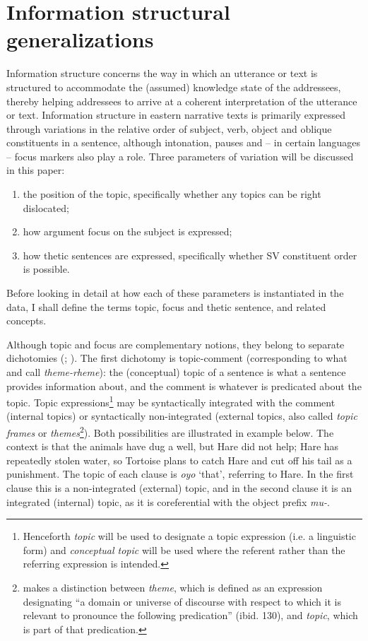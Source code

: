 \documentclass[output=paper]{langsci/langscibook}
\begin{document}
\section{Information structural generalizations}\label{§2:information.nicolle}

Information structure concerns the way in which an utterance or text is structured to accommodate the (assumed) knowledge state of the addressees, thereby helping addressees to arrive at a coherent interpretation of the utterance or text. Information structure in eastern  narrative texts is primarily expressed through variations in the relative order of subject, verb, object and oblique constituents in a sentence, although intonation, pauses and -- in certain languages -- focus markers also play a role. Three parameters of variation will be discussed in this paper:

\begin{enumerate}[noitemsep]
\item the position of the topic, specifically whether any topics can be right dislocated;
\item how argument focus on the subject is expressed;
\item how thetic sentences are expressed, specifically whether SV constituent order is possible.
\end{enumerate}

Before looking in detail at how each of these parameters is instantiated in the data, I shall define the terms topic, focus and thetic sentence, and related concepts.

Although topic and focus are complementary notions, they belong to separate dichotomies (\citealt[66]{decat2007}; \citealt[42]{erteschikshir2007}). The first dichotomy is topic-comment (corresponding to what \citet{halliday1967} and \citet{dik1981,dik1989} call \textit{theme-rheme}): the (conceptual) topic of a sentence is what a sentence provides information about, and the comment is whatever is predicated about the topic. Topic expressions\footnote{Henceforth \textit{topic} will be used to designate a topic expression (i.e. a linguistic form) and \textit{conceptual topic} will be used where the referent rather than the referring expression is intended.} may be syntactically integrated with the comment (internal topics) or syntactically non-integrated (external topics, also called \textit{topic frames} or \textit{themes}\footnote{\citet[129--144]{dik1981} makes a distinction between \textit{theme}, which is defined as an expression designating “a domain or universe of discourse with respect to which it is relevant to pronounce the following predication” (ibid. 130), and \textit{topic}, which is part of that predication.}). Both possibilities are illustrated in example  below. The context is that the animals have dug a well, but Hare did not help; Hare has repeatedly stolen water, so Tortoise plans to catch Hare and cut off his tail as a punishment. The topic of each clause is  \textit{oyo} ‘that’, referring to Hare. In the first clause this is a non-integrated (external) topic, and in the second clause it is an integrated (internal) topic, as it is coreferential with the object prefix \textit{mu-}.
\end{document}
